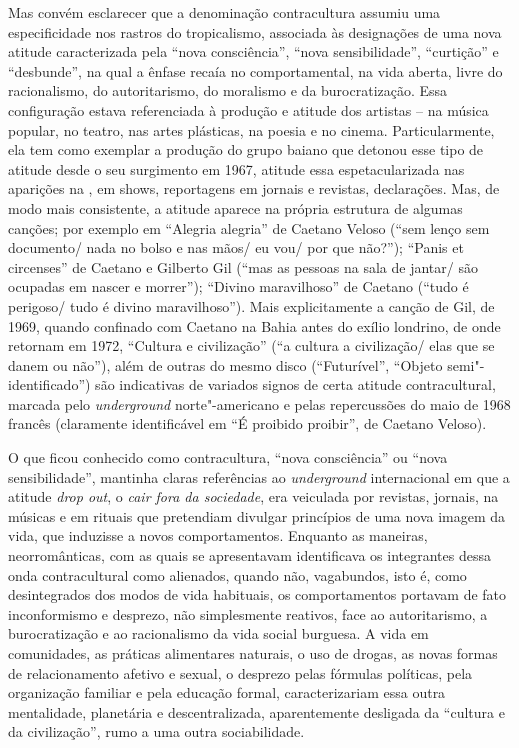 Mas convém esclarecer que a denominação contracultura assumiu uma
especificidade nos rastros do tropicalismo, associada às designações de
uma nova atitude caracterizada pela ``nova consciência'',
``nova sensibilidade'', ``curtição'' e ``desbunde'', na qual a ênfase
recaía no comportamental, na vida aberta, livre do racionalismo, do
autoritarismo, do moralismo e da burocratização. Essa configuração
estava referenciada à produção e atitude dos artistas -- na música
popular, no teatro, nas artes plásticas, na poesia e no cinema.
Particularmente, ela tem como exemplar a produção do grupo
baiano que detonou esse tipo de atitude desde o seu surgimento em 1967,
atitude essa espetacularizada nas aparições na , em shows,
reportagens em jornais e revistas, declarações. Mas, de modo mais
consistente, a atitude aparece na própria estrutura de algumas canções;
por exemplo em ``Alegria alegria'' de Caetano Veloso (``sem lenço sem
documento/ nada no bolso e nas mãos/ eu vou/ por que não?''); ``Panis
et circenses'' de Caetano e Gilberto Gil (``mas as pessoas na sala de jantar/ são
ocupadas em nascer e morrer''); ``Divino maravilhoso'' de Caetano
(``tudo é perigoso/ tudo é divino maravilhoso''). Mais explicitamente a
canção de Gil, de 1969, quando confinado com Caetano na Bahia antes do
exílio londrino, de onde retornam em 1972, ``Cultura e
civilização'' (``a cultura a civilização/ elas que se danem ou não''),
além de outras do mesmo disco (``Futurível'', ``Objeto semi"-identificado'') são indicativas de
variados signos de certa atitude contracultural, marcada pelo
\emph{underground} norte"-americano e pelas repercussões do maio de 1968
francês (claramente identificável em ``É proibido proibir'', de Caetano Veloso).

O que ficou conhecido como contracultura, ``nova consciência'' ou ``nova
sensibilidade'', mantinha claras referências ao \emph{underground}
internacional em que a atitude \emph{drop out}, o \emph{cair fora da
sociedade}, era veiculada por revistas, jornais, na músicas e em
rituais que pretendiam divulgar princípios de uma nova imagem da vida,
que induzisse a novos comportamentos. Enquanto as maneiras,
neorromânticas, com as quais se apresentavam identificava os integrantes dessa onda
contracultural como alienados, quando não, vagabundos, isto é, como
desintegrados dos modos de vida habituais, os comportamentos portavam de
fato inconformismo e desprezo, não simplesmente reativos,
face ao autoritarismo, a burocratização e ao racionalismo da vida social
burguesa. A vida em comunidades, as práticas alimentares naturais, o uso
de drogas, as novas formas de relacionamento afetivo e sexual, o
desprezo pelas fórmulas políticas, pela organização familiar e pela
educação formal, caracterizariam essa outra mentalidade, planetária e
descentralizada, aparentemente desligada da ``cultura e da
civilização'', rumo a uma outra sociabilidade.

